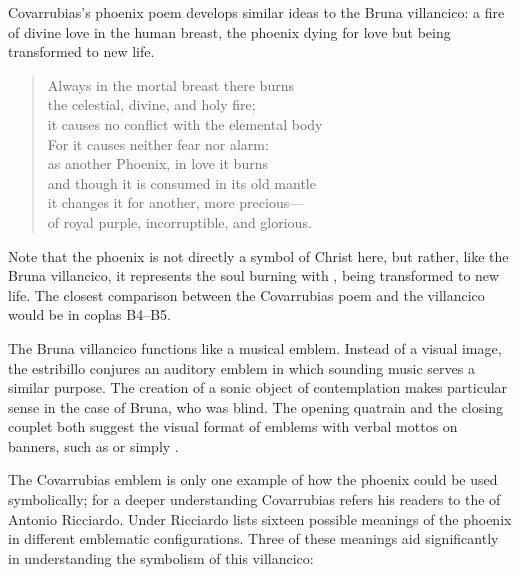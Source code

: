 Covarrubias's phoenix poem develops similar ideas to the Bruna villancico: a fire of divine love in the human breast, the phoenix dying for love but being transformed to new life.

\begin{verse}
Always in the mortal breast there burns\\
the celestial, divine, and holy fire;\\ 
it causes no conflict with the elemental body\\
For it causes neither fear nor alarm:\\
as another Phoenix, in love it burns\\
and though it is consumed in its old mantle\\
it changes it for another, more precious---\\
of royal purple, incorruptible, and glorious.
\end{verse}
%
Note that the phoenix is not directly a symbol of Christ here, but rather, like the Bruna villancico, it represents the soul burning with , being transformed to new life.
The closest comparison between the Covarrubias poem and the villancico would be in coplas B4--B5.



The Bruna villancico functions like a musical emblem. 
Instead of a visual image, the estribillo conjures an auditory emblem in which sounding music serves a similar purpose. 
The creation of a sonic object of contemplation makes particular sense in the case of Bruna, who was blind.
The opening quatrain and the closing couplet both suggest the visual format of emblems with verbal mottos on banners, such as  or simply .

The Covarrubias emblem is only one example of how the phoenix could be used symbolically; for a deeper understanding Covarrubias refers his readers to the  of Antonio Ricciardo.%
	\autocite{Ricciardo:CommentariaSymbolica}
Under  Ricciardo lists sixteen possible meanings of the phoenix in different emblematic configurations.
Three of these meanings aid significantly in understanding the symbolism of this villancico:

